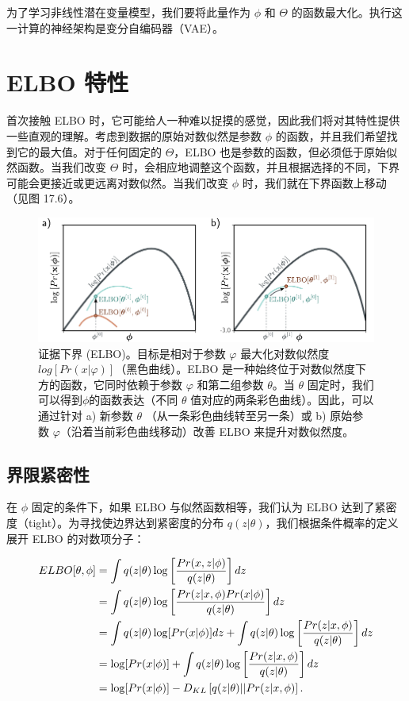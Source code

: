 \documentclass[lang=cn,newtx,10pt,scheme=chinese]{elegantbook}
\begin{document}
为了学习非线性潜在变量模型，我们要将此量作为 \(\phi\) 和 \(\Theta\) 的函数最大化。执行这一计算的神经架构是变分自编码器（VAE）。

\section{ELBO 特性 }
首次接触 ELBO 时，它可能给人一种难以捉摸的感觉，因此我们将对其特性提供一些直观的理解。考虑到数据的原始对数似然是参数 \(\phi\) 的函数，并且我们希望找到它的最大值。对于任何固定的 \(\Theta\)，ELBO 也是参数的函数，但必须低于原始似然函数。当我们改变 \(\Theta\) 时，会相应地调整这个函数，并且根据选择的不同，下界可能会更接近或更远离对数似然。当我们改变 \(\phi\) 时，我们就在下界函数上移动（见图 17.6）。

\begin{figure}[ht!]
\centering
\includegraphics[width=0.7\linewidth]{PDFFigures/UDLChap17PDF/VAEELBO.pdf}
\caption{证据下界 (ELBO)。目标是相对于参数 \(\varphi\) 最大化对数似然度 \(log[Pr(x|\varphi)]\)（黑色曲线）。ELBO 是一种始终位于对数似然度下方的函数，它同时依赖于参数 \(\varphi\) 和第二组参数 \(\theta\)。当 \(\theta\) 固定时，我们可以得到\(\phi\)的函数表达（不同 \(\theta\) 值对应的两条彩色曲线）。因此，可以通过针对 a) 新参数  \(\theta\) （从一条彩色曲线转至另一条）或 b) 原始参数 \(\varphi\)（沿着当前彩色曲线移动）改善 ELBO 来提升对数似然度。}
\end{figure}


\subsection{界限紧密性}
在 \(\phi\) 固定的条件下，如果 ELBO 与似然函数相等，我们认为 ELBO 达到了紧密度（tight）。为寻找使边界达到紧密度的分布 \(q(z|\theta)\)，我们根据条件概率的定义展开 ELBO 的对数项分子：


\begin{align}
ELBO[\theta, \phi] &= \int q(z|\theta) \log \left[ \frac{Pr(x, z|\phi)}{q(z|\theta)} \right] dz \notag \\
&= \int q(z|\theta) \log \left[ \frac{Pr(z|x, \phi)Pr(x|\phi)}{q(z|\theta)} \right] dz \notag \\
&= \int q(z|\theta) \log [Pr(x|\phi)] dz + \int q(z|\theta) \log \left[ \frac{Pr(z|x, \phi)}{q(z|\theta)} \right] dz \notag \\
&= \log [Pr(x|\phi)] + \int q(z|\theta) \log \left[ \frac{Pr(z|x, \phi)}{q(z|\theta)} \right] dz \notag \\
&= \log [Pr(x|\phi)] - D_{KL} \left[ q(z|\theta) || Pr(z|x, \phi) \right]. 
\end{align} 
\end{document}
